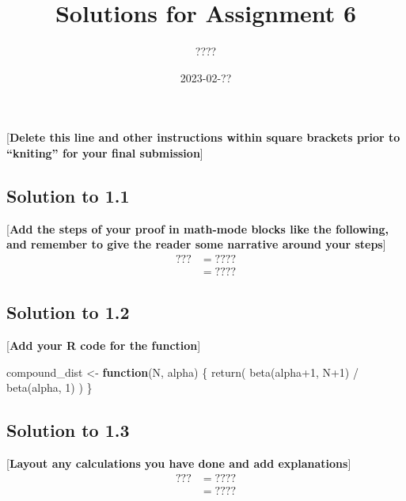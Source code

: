 \documentclass[
]{article}
\title{Solutions for Assignment 6}
\author{????}
\date{2023-02-??}
\newenvironment{Shaded}{\begin{snugshade}}{\end{snugshade}}
\newcommand{\ControlFlowTok}[1]{\textcolor[rgb]{0.13,0.29,0.53}{\textbf{#1}}}
\newcommand{\DecValTok}[1]{\textcolor[rgb]{0.00,0.00,0.81}{#1}}
\newcommand{\FunctionTok}[1]{\textcolor[rgb]{0.00,0.00,0.00}{#1}}
\newcommand{\NormalTok}[1]{#1}
\newcommand{\OtherTok}[1]{\textcolor[rgb]{0.56,0.35,0.01}{#1}}
\newcommand{\SpecialCharTok}[1]{\textcolor[rgb]{0.00,0.00,0.00}{#1}}
\begin{document}
\maketitle

{[}\textbf{Delete this line and other instructions within square
brackets prior to ``kniting'' for your final submission}{]}

\hypertarget{solution-to-1.1}{%
\subsection{Solution to 1.1}\label{solution-to-1.1}}

{[}\textbf{Add the steps of your proof in math-mode blocks like the
following, and remember to give the reader some narrative around your
steps}{]} \begin{align*}
  ??? &= ???? \\
  &= ????
\end{align*}

\hypertarget{solution-to-1.2}{%
\subsection{Solution to 1.2}\label{solution-to-1.2}}

{[}\textbf{Add your R code for the function}{]}

\begin{Shaded}
\begin{Highlighting}[]
\NormalTok{compound\_dist }\OtherTok{\textless{}{-}} \ControlFlowTok{function}\NormalTok{(N, alpha) \{}
  \FunctionTok{return}\NormalTok{( }\FunctionTok{beta}\NormalTok{(alpha}\SpecialCharTok{+}\DecValTok{1}\NormalTok{, N}\SpecialCharTok{+}\DecValTok{1}\NormalTok{) }\SpecialCharTok{/} \FunctionTok{beta}\NormalTok{(alpha, }\DecValTok{1}\NormalTok{) )}
\NormalTok{\}}
\end{Highlighting}
\end{Shaded}

\hypertarget{solution-to-1.3}{%
\subsection{Solution to 1.3}\label{solution-to-1.3}}

{[}\textbf{Layout any calculations you have done and add
explanations}{]} \begin{align*}
  ??? &= ???? \\
  &= ????
\end{align*}
\end{document}
